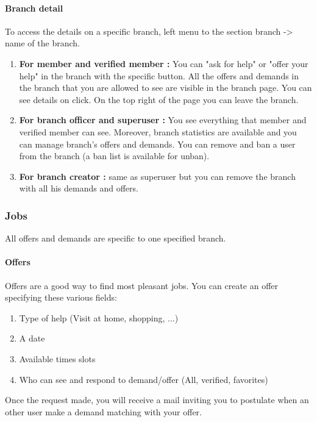 \documentclass[11pt, a4paper]{article}      %
\begin{document}
\paragraph{Branch detail}
To access the details on a specific branch, left menu to the section branch -> name of the branch.
\begin{enumerate}
    \item \textbf{For member and verified member :} You can "ask for help" or "offer your help" in the branch with the specific button. All the offers and demands in the branch that you are allowed to see are visible in the branch page.
You can see details on click.
On the top right of the page you can leave the branch.
    \item \textbf{For branch officer and superuser :} You see everything that member and verified member can see. Moreover, branch statistics are available and you can manage branch's offers and demands. You can remove and ban a user from the branch (a ban list is available for unban).
    \item \textbf{For branch creator :} same as superuser but you can remove the branch with all his demands and offers.
\end{enumerate}

\subsubsection{Jobs}

All offers and demands are specific to one specified branch. 

\paragraph{Offers}
Offers are a good way to find most pleasant jobs. 
You can create an offer specifying these various fields:
\begin{enumerate}
    \item Type of help (Visit at home, shopping, ...)
    \item A date
    \item Available times slots
    \item Who can see and respond to demand/offer (All, verified, favorites)
\end{enumerate}
Once the request made, you will receive a mail inviting you to postulate when an other user make a demand matching with your offer. 
\end{document}
